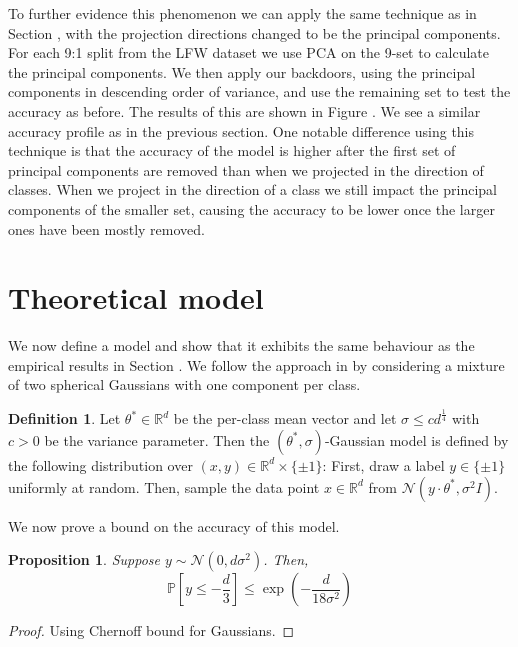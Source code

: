 \documentclass{article}
\theoremstyle{plain}
\newtheorem{proposition}[theorem]{Proposition}
\theoremstyle{definition}
\newtheorem{definition}[theorem]{Definition}
\theoremstyle{remark}
\begin{document}
To further evidence this phenomenon we can apply the same technique as in Section , with the projection directions changed to be the principal components. For each 9:1 split from the LFW dataset we use PCA on the 9-set to calculate the principal components. We then apply our backdoors, using the principal components in descending order of variance, and use the remaining set to test the accuracy as before. The results of this are shown in Figure \todo{}. We see a similar accuracy profile as in the previous section. One notable difference using this technique is that the accuracy of the model is higher after the first set of principal components are removed than when we projected in the direction of classes. When we project in the direction of a class we still impact the principal components of the smaller set, causing the accuracy to be lower once the larger ones have been mostly removed.

\section{Theoretical model}
\label{Theoretical model}
We now define a model and show that it exhibits the same behaviour as the empirical results in Section . We follow the approach in  by considering a mixture of two spherical Gaussians with one component per class.

\begin{definition}
    \label{def:gaussian-model}
    Let \( \theta^{*}\in\mathbb{R}^d \) be the per-class mean vector and let \( \sigma \leq cd^{\frac{1}{4}} \) with \( c>0 \) be the variance parameter. Then the \( (\theta^*, \sigma) \)-Gaussian model is defined by the following distribution over \( (x,y)\in\mathbb{R}^d\times\{\pm1\} \): First, draw a label \( y\in\{\pm1\} \) uniformly at random. Then, sample the data point \( x\in\mathbb{R}^d \) from \( \mathcal{N}(y\cdot\theta^*, \sigma^2I) \).
\end{definition}

We now prove a bound on the accuracy of this model.

\begin{proposition}
    Suppose \( y\sim\mathcal{N}(0, d\sigma^2) \). Then,
    \begin{equation}
        \mathbb{P}\left[y\leq -\frac{d}{3}\right] \leq \exp\left(-\frac{d}{18\sigma^2}\right)
    \end{equation}
\end{proposition}
\begin{proof}
    Using Chernoff bound for Gaussians.
\end{proof}
\end{document}

